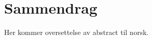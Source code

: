 \chapter{Sammendrag}

Her kommer oversettelse av abstract til norsk.






\makeatletter
{}


\makeatother







